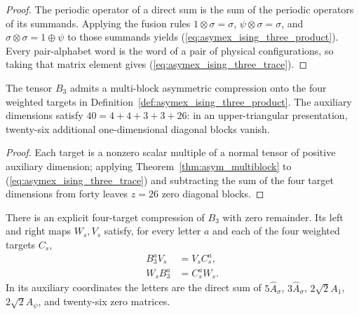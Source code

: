 \begin{proof}
    \leanok
    The periodic operator of a direct sum is the sum of the periodic
    operators of its summands. Applying the fusion rules
    $1\otimes\sigma=\sigma$, $\psi\otimes\sigma=\sigma$, and
    $\sigma\otimes\sigma=1\oplus\psi$ to those summands yields
    (\ref{eq:asymex_ising_three_product}). Every pair-alphabet word is
    the word of a pair of physical configurations, so taking that matrix
    element gives (\ref{eq:asymex_ising_three_trace}).
\end{proof}

\begin{lemma}%
    \label{thm:asymex_ising_three_compression}
    \leanok
    The tensor $B_3$ admits a multi-block asymmetric compression onto the
    four weighted targets in Definition~\ref{def:asymex_ising_three_product}.
    The auxiliary dimensions satisfy $40=4+4+3+3+26$: in an
    upper-triangular presentation, twenty-six additional one-dimensional
    diagonal blocks vanish.
\end{lemma}

\begin{proof}
    \leanok
    Each target is a nonzero scalar multiple of a normal tensor of
    positive auxiliary dimension; applying Theorem~\ref{thm:asym_multiblock}
    to (\ref{eq:asymex_ising_three_trace}) and subtracting the sum of the
    four target dimensions from forty leaves $z=26$ zero diagonal blocks.
\end{proof}

\begin{lemma}%
    \label{thm:asymex_ising_three_split}
    \leanok
    There is an explicit four-target compression of $B_3$ with zero remainder.
    Its left and right maps $W_s,V_s$ satisfy, for every letter $a$ and each
    of the four weighted targets $C_s$,
    \begin{align*}
        B_3^aV_s & = V_sC_s^a, \\
        W_sB_3^a & = C_s^aW_s.
    \end{align*}
    In its auxiliary coordinates the letters are the direct sum of
    $5\widehat A_\sigma$, $3\widehat A_\sigma$,
    $2\sqrt2 A_1$, $2\sqrt2 A_\psi$, and twenty-six zero matrices.
\end{lemma}

